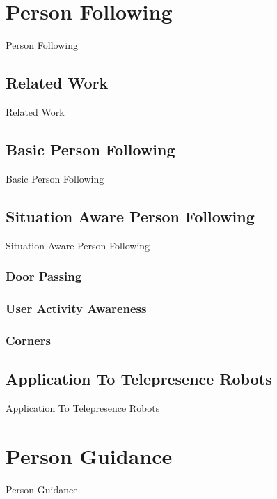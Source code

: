 \documentclass[12pt]{gatech-thesis}
\begin{document}
\chapter{Person Following}

Person Following

\section{Related Work}

Related Work

\section{Basic Person Following}
\label{sec:following_basic_person_following}

Basic Person Following

\section{Situation Aware Person Following}

Situation Aware Person Following

\subsection{Door Passing}

\subsection{User Activity Awareness}

\subsection{Corners}


\section{Application To Telepresence Robots}

Application To Telepresence Robots


\chapter{Person Guidance}

Person Guidance
\end{document}
